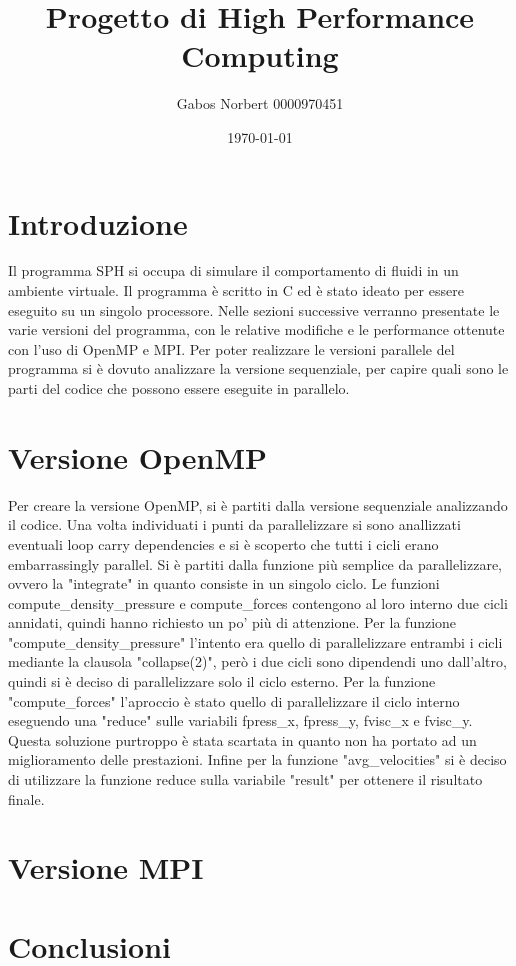 \documentclass[a4paper,12pt, oneside]{article}
\title{Progetto di High Performance Computing}
\author{Gabos Norbert 0000970451}
\date{\today}
\begin{document}
\maketitle

\section{Introduzione}

Il programma SPH si occupa di simulare il comportamento di fluidi in un ambiente virtuale.
Il programma è scritto in C ed è stato ideato per essere eseguito su un singolo processore.
Nelle sezioni successive verranno presentate le varie versioni del programma, con le relative
modifiche e le performance ottenute con l'uso di OpenMP e MPI.
Per poter realizzare le versioni parallele del programma si è dovuto analizzare la versione
sequenziale, per capire quali sono le parti del codice che possono essere eseguite in parallelo.

\section{Versione OpenMP}

Per creare la versione OpenMP, si è partiti dalla versione sequenziale analizzando il codice.
Una volta individuati i punti da parallelizzare si sono anallizzati eventuali loop carry dependencies
e si è scoperto che tutti i cicli erano embarrassingly parallel.
Si è partiti dalla funzione più semplice da parallelizzare, ovvero la "integrate" in quanto consiste in un
singolo ciclo. Le funzioni compute_density_pressure e compute_forces contengono al loro interno due cicli
annidati, quindi hanno richiesto un po' più di attenzione.
Per la funzione "compute_density_pressure" l'intento era quello di parallelizzare entrambi i cicli mediante
la clausola "collapse(2)", però i due cicli sono dipendendi uno dall'altro, quindi si è deciso di
parallelizzare solo il ciclo esterno.
Per la funzione "compute_forces" l'aproccio è stato quello di parallelizzare il ciclo interno eseguendo
una "reduce" sulle variabili fpress_x, fpress_y, fvisc_x e fvisc_y. Questa soluzione purtroppo è stata
scartata in quanto non ha portato ad un miglioramento delle prestazioni.
Infine per la funzione "avg_velocities" si è deciso di utilizzare la funzione reduce sulla variabile
"result" per ottenere il risultato finale.

\section{Versione MPI}
\section{Conclusioni}
\end{document}
